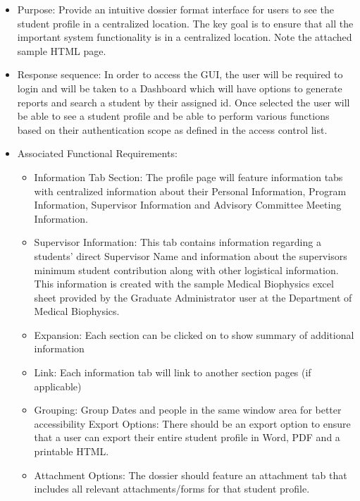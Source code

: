 \documentclass{journal}
\begin{document}
\begin{itemize}
\item Purpose: Provide an intuitive dossier format interface for users to see the student profile in a centralized location. The key goal is to ensure that all the important system functionality is in a centralized location. Note the attached sample HTML page.
\item Response sequence: In order to access the GUI, the user will be required to login and will be taken to a Dashboard which will have options to generate reports and search a student by their assigned id. Once selected the user will be able to see a student profile and be able to perform various functions based on their authentication scope as defined in the access control list.
\item Associated Functional Requirements:
\begin{itemize}
\item Information Tab Section: The profile page will feature information tabs with centralized information about their Personal Information, Program Information, Supervisor Information and Advisory Committee Meeting Information. 
\item Supervisor Information: This tab contains information regarding a students' direct Supervisor Name and information about the supervisors minimum student contribution along with other logistical information. This information is created with the sample Medical Biophysics excel sheet provided by the Graduate Administrator user at the Department of Medical Biophysics.	

\item Expansion: Each section can be clicked on to show summary of additional information
\item Link:  Each information tab will link to another section pages (if applicable)
\item Grouping: Group Dates and people in the same window area for better accessibility
Export Options: There should be an export option to ensure that a user can export their entire student profile in Word, PDF and a printable HTML.
\item Attachment Options: The dossier should feature an attachment tab that includes all relevant attachments/forms for that student profile.
\end{itemize}
\end{itemize}
\end{document}
